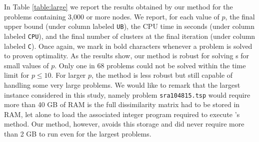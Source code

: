 \documentclass[ijoo,nonblindrev]{informs-ijoo}
\begin{document}
In Table \ref{table:large} we report the results obtained by our method for the problems containing 3,000 or more nodes. We report, for each value of $p$, the final upper bound (under column labeled \texttt{UB}), the CPU time in seconds (under column labeled \texttt{CPU}), and the final number of clusters at the final iteration (under column labeled \texttt{C}). Once again, we mark in bold characters whenever a problem is solved to proven optimality. As the results show, our method is robust for solving \pDP{}s for small values of $p$. Only one in 68 problems could not be solved within the time limit for $p\leq 10$. For larger $p$, the method is less robust but still capable of handling some very large problems. We would like to remark that the largest instance considered in this study, namely problem \texttt{sra104815.tsp} would require more than 40 GB of RAM is the full dissimilarity matrix had to be stored in RAM, let alone to load the associated integer program required to execute \citeauthor{Sayah2017new}'s method. Our method, however, avoids this storage and did never require more than 2 GB to run even for the largest problems.
\end{document}
